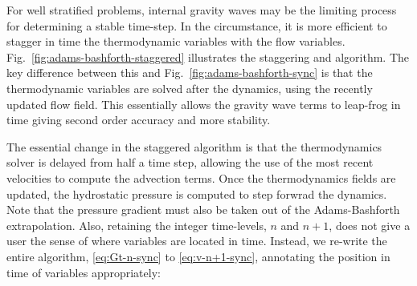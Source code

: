 For well stratified problems, internal gravity waves may be the
limiting process for determining a stable time-step. In the
circumstance, it is more efficient to stagger in time the
thermodynamic variables with the flow
variables. Fig.~\ref{fig:adams-bashforth-staggered} illustrates the
staggering and algorithm. The key difference between this and
Fig.~\ref{fig:adams-bashforth-sync} is that the thermodynamic variables 
are solved after the dynamics, using the recently updated flow field.
This essentially allows the gravity wave terms to leap-frog in
time giving second order accuracy and more stability.

The essential change in the staggered algorithm is that the 
thermodynamics solver is delayed from half a time step, 
allowing the use of the most recent velocities to compute 
the advection terms. Once the thermodynamics fields are
updated, the hydrostatic pressure is computed 
to step forwrad the dynamics.
Note that the pressure gradient must also be taken out of the
Adams-Bashforth extrapolation. Also, retaining the integer time-levels,
$n$ and $n+1$, does not give a user the sense of where variables are
located in time.  Instead, we re-write the entire algorithm,
\ref{eq:Gt-n-sync} to \ref{eq:v-n+1-sync}, annotating the
position in time of variables appropriately:
